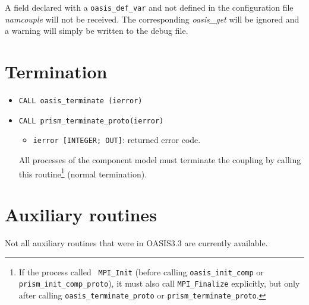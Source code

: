 A field declared  with a {\tt oasis\_def\_var} and not defined in the configuration file {\it namcouple} will not be received. The corresponding {\it oasis\_get} will be ignored and a warning will simply be written to the debug file.

\section{Termination}
\label{subsubsec_Termination}

\begin{itemize}

\item {\tt CALL oasis\_terminate       (ierror)}
\item {\tt CALL prism\_terminate\_proto(ierror)}
  \begin{itemize}
  \item {\tt ierror [INTEGER; OUT]}: returned error code.
  \end{itemize}
  All processes of the component model must terminate the coupling by
  calling this routine\footnote{If the process called {\tt
  MPI\_Init} (before calling {\tt oasis\_init\_comp} or {\tt prism\_init\_comp\_proto}), it must
  also call {\tt MPI\_Finalize} explicitly, but only after calling
  {\tt oasis\_terminate\_proto} or {\tt prism\_terminate\_proto}.} (normal termination). 

\end{itemize}


\section{Auxiliary routines}
\label{subsubsec_auxroutines}

Not all auxiliary routines that were in OASIS3.3 are currently available.


